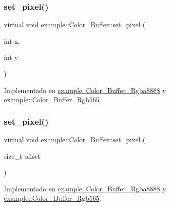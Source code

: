 \mbox{\label{classexample_1_1_color___buffer_a967ea326ec0889a36db523727a8154b5}} 
\subsubsection{\texorpdfstring{set\_pixel()}{set\_pixel()}\hspace{0.1cm}{\footnotesize\ttfamily [1/2]}}
{\footnotesize\ttfamily virtual void example\+::\+Color\+\_\+\+Buffer\+::set\+\_\+pixel (\begin{DoxyParamCaption}\item[{int}]{x,  }\item[{int}]{y }\end{DoxyParamCaption})\hspace{0.3cm}{\ttfamily [pure virtual]}}



Implementado en \mbox{\hyperlink{classexample_1_1_color___buffer___rgba8888_aceb94fbc6797177c5a401f4d10d56766}{example\+::\+Color\+\_\+\+Buffer\+\_\+\+Rgba8888}} y \mbox{\hyperlink{classexample_1_1_color___buffer___rgb565_a0f3e81af58dbe0b6456c239b24221baa}{example\+::\+Color\+\_\+\+Buffer\+\_\+\+Rgb565}}.

\mbox{\label{classexample_1_1_color___buffer_a1c919e629ef74e418e1ad416d0a5e85a}} 
\subsubsection{\texorpdfstring{set\_pixel()}{set\_pixel()}\hspace{0.1cm}{\footnotesize\ttfamily [2/2]}}
{\footnotesize\ttfamily virtual void example\+::\+Color\+\_\+\+Buffer\+::set\+\_\+pixel (\begin{DoxyParamCaption}\item[{size\+\_\+t}]{offset }\end{DoxyParamCaption})\hspace{0.3cm}{\ttfamily [pure virtual]}}



Implementado en \mbox{\hyperlink{classexample_1_1_color___buffer___rgba8888_ac741fa7bca9b980a475e6f7033b64347}{example\+::\+Color\+\_\+\+Buffer\+\_\+\+Rgba8888}} y \mbox{\hyperlink{classexample_1_1_color___buffer___rgb565_a53f9763360ddbb788e0dfa0ec5a0a9f9}{example\+::\+Color\+\_\+\+Buffer\+\_\+\+Rgb565}}.



